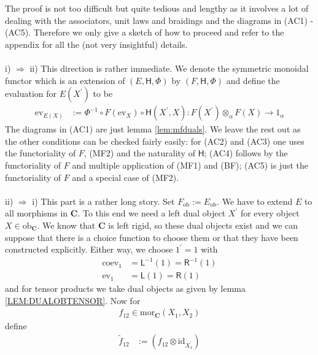\begin{prf}[Sketch]
The proof is not too difficult but quite tedious and lengthy as it involves a lot of dealing with the associators, unit laws and braidings and the diagrams in (AC1) - (AC5). Therefore we only give a sketch of how to proceed and refer to the appendix for all the (not very insightful) details.
\\\\
i) $\Rightarrow$ ii)
\qquad
This direction is rather immediate. We denote the symmetric monoidal functor which is an extension of $(E,\mathsf{H},\Phi)$ by $(F,\mathsf{H},\Phi)$ and define the evaluation for $E(X^{\prime})$ to be
\begin{align*}
  \mathrm{ev}_{E(X)}
  &:=
  \Phi^{-1}
  \circ
  F(\mathrm{ev}_{X})
  \circ
  \mathsf{H}(X^{\prime},X)
  \colon
  F(X^{\prime})
  \otimes_{\alpha}
  F(X)
  \to
  1_{\alpha}
\end{align*}
The diagrams in (AC1) are just lemma \ref{lem:mfduals}. We leave the rest out as the other conditions can be checked fairly easily: for (AC2) and (AC3) one uses the functoriality of $F$, (MF2) and the naturality of $\mathsf{H}$; (AC4) follows by the functoriality of $F$ and multiple application of (MF1) and (BF); (AC5) is just the functoriality of $F$ and a special case of (MF2).
\\\\
ii) $\Rightarrow$ i)
\qquad
This part is a rather long story. Set $F_{\mathrm{ob}} := E_{\mathrm{ob}}$. We have to extend $E$ to all morphisms in $\mathbf{C}$. To this end we need a left dual object $X^{\prime}$ for every object $X \in \mathrm{ob}_{\mathbf{C}}$. We know that $\mathbf{C}$ is left rigid, so these dual objects exist and we can suppose that there is a choice function to choose them or that they have been constructed explicitly. Either way, we choose $1^{\prime} = 1$ with
\begin{align*}
  \mathrm{coev}_{1}
  &=
  \mathsf{L}^{-1}(1)
  =
  \mathsf{R}^{-1}(1)
  \\
  \mathrm{ev}_{1}
  &=
  \mathsf{L}(1)
  =
  \mathsf{R}(1)
\end{align*}
and for tensor products we take dual objects as given by lemma \ref{LEM:DUALOBTENSOR}. Now for
\begin{align*}
  f_{12}
  \in
  \mathrm{mor}_{\mathbf{C}}(X_{1},X_{2})
\end{align*}
define
\begin{align*}
  \tilde{f}_{12}
  &:=
  \left(
    f_{12}
    \otimes
    \mathrm{id}_{X_{1}^{\prime}}
  \right)

\end{align*}
\end{prf}

